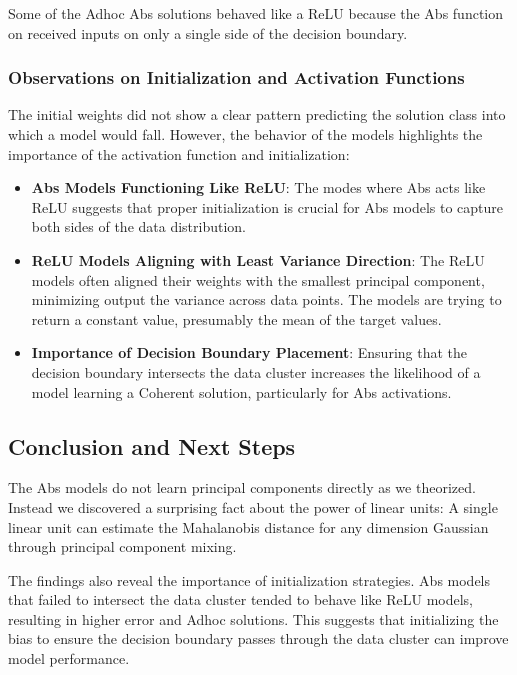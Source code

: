 Some of the Adhoc Abs solutions behaved like a ReLU because the Abs function on received inputs on only a single side of the decision boundary. 

\subsubsection{Observations on Initialization and Activation Functions}

The initial weights did not show a clear pattern predicting the solution class into which a model would fall. However, the behavior of the models highlights the importance of the activation function and initialization:

\begin{itemize} 
    \item \textbf{Abs Models Functioning Like ReLU}: The modes where Abs acts like ReLU suggests that proper initialization is crucial for Abs models to capture both sides of the data distribution.
    \item \textbf{ReLU Models Aligning with Least Variance Direction}: The ReLU models often aligned their weights with the smallest principal component, minimizing output the variance across data points. The models are trying to return a constant value, presumably the mean of the target values.
    \item \textbf{Importance of Decision Boundary Placement}: Ensuring that the decision boundary intersects the data cluster increases the likelihood of a model learning a Coherent solution, particularly for Abs activations.
\end{itemize}

\subsection{Conclusion and Next Steps}

The Abs models do not learn principal components directly as we theorized. Instead we discovered a surprising fact about the power of linear units: A single linear unit can estimate the Mahalanobis distance for any dimension Gaussian through principal component mixing.

The findings also reveal the importance of initialization strategies. Abs models that failed to intersect the data cluster tended to behave like ReLU models, resulting in higher error and Adhoc solutions. This suggests that initializing the bias to ensure the decision boundary passes through the data cluster can improve model performance.

